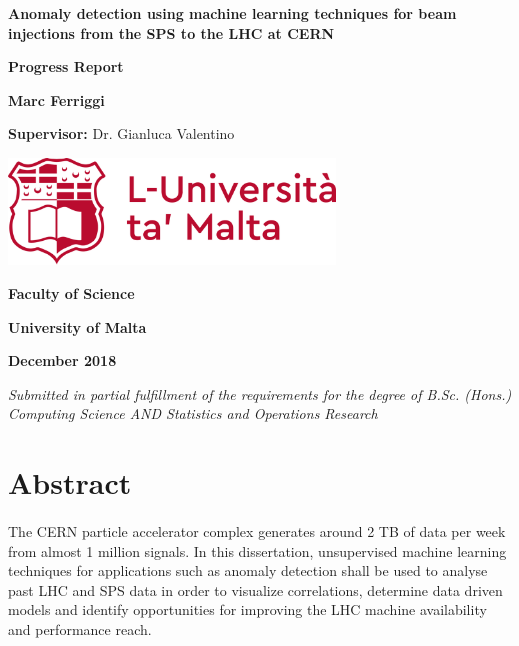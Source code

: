 \documentclass[12pt, twoside]{report}
\begin{document}
	\begin{titlepage}
		\centering
		{\LARGE\bfseries Anomaly detection using machine learning techniques for beam injections from the SPS to the LHC at CERN\par}
		\vspace{.5cm}
		
		{\Large \textbf{Progress Report} \par}
		\vspace{.5cm}
		
		{\large \textbf{Marc Ferriggi}\par}
		\vspace{0.5cm}
		
		{\large \textbf{Supervisor:} Dr. Gianluca Valentino\par}
		\vfill
		
		\includegraphics[width=0.65\textwidth]{UoMLogo}\par
		\vfill
		
		{\large\bfseries Faculty of Science \par}
		{\large\bfseries University of Malta \par}
		{\large\bfseries December 2018 \par}
		
		\vspace{1cm}
		\textit{Submitted in partial fulfillment of the requirements for the degree of B.Sc. (Hons.) Computing Science AND Statistics and Operations Research}
	\end{titlepage}
	
	\tableofcontents
	\vfill
	\cleardoublepage
	
	\section{Abstract}
	\paragraph{ }The CERN particle accelerator complex generates around 2 TB of data per week from almost 1 million signals. In this dissertation, unsupervised machine learning techniques for applications such as anomaly detection shall be used to analyse past LHC and SPS data in order to visualize correlations, determine data driven models and identify opportunities for improving the LHC machine availability and performance reach.
	
\end{document}
